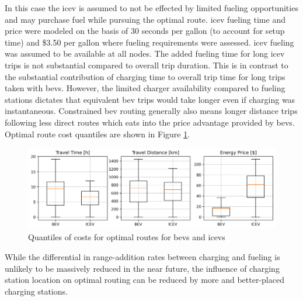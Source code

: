 In this case the \gls{icev} is assumed to not be effected by limited fueling opportunities and may purchase fuel while pursuing the optimal route. \gls{icev} fueling time and price were modeled on the basis of 30 seconds per gallon (to account for setup time) and \$3.50 per gallon where fueling requirements were assessed. \gls{icev} fueling was assumed to be available at all nodes. The added fueling time for long \gls{icev} trips is not substantial compared to overall trip duration. This is in contrast to the substantial contribution of charging time to overall trip time for long trips taken with \glspl{bev}. However, the limited charger availability compared to fueling stations dictates that equivalent \gls{bev} trips would take longer even if charging was instantaneous. Constrained \gls{bev} routing generally also means longer distance trips following less direct routes which eats into the price advantage provided by \glspl{bev}. Optimal route cost quantiles are shown in Figure \ref{fig:routes_boxplots}.

\begin{figure}[H]
	\centering
	\includegraphics[width = \linewidth]{figs/routes_boxplots.png}
	\caption{Quantiles of costs for optimal routes for \glspl{bev} and \glspl{icev}}
	\label{fig:routes_boxplots}
\end{figure}

While the differential in range-addition rates between charging and fueling is unlikely to be massively reduced in the near future, the influence of charging station location on optimal routing can be reduced by more and better-placed charging stations.